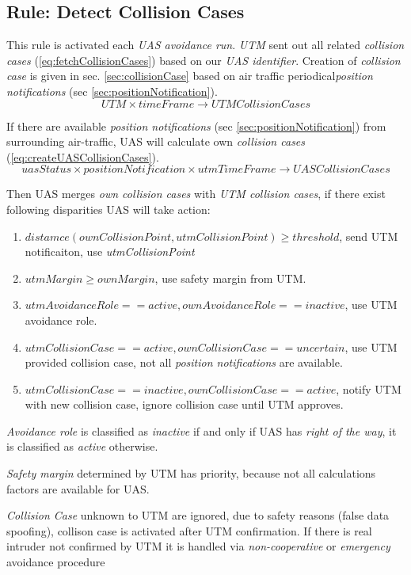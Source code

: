 \subsection{Rule: Detect Collision Cases}\label{sec:detectCollisionCases}
\noindent This rule is activated each \emph{UAS avoidance run}. \emph{UTM} sent out all related \emph{collision cases} (\ref{eq:fetchCollisionCases}) based on our \emph{UAS identifier}. Creation of \emph{collision case} is given in sec. \ref{sec:collisionCase} based on air traffic periodical\emph{position notifications} (sec \ref{sec:positionNotification}).
\begin{equation}\label{eq:fetchCollisionCases}
    UTM\times timeFrame \to UTMCollisionCases
\end{equation}

\noindent If there are available \emph{position notifications} (sec \ref{sec:positionNotification}) from surrounding air-traffic, UAS will calculate own \emph{collision cases} (\ref{eq:createUASCollisionCases}).
\begin{equation}\label{eq:createUASCollisionCases}
    uasStatus\times positionNotification\times utmTimeFrame\to UASCollisionCases
\end{equation}

\noindent Then UAS merges \emph{own collision cases} with \emph{UTM collision cases}, if there exist following disparities UAS will take action:
\begin{enumerate}
    \item $distamce(ownCollisionPoint,utmCollisionPoint)\ge threshold$, send UTM notificaiton, use \emph{utmCollisionPoint}
    \item $utmMargin \ge ownMargin$, use safety margin from UTM.
    \item $utmAvoidanceRole == active, ownAvoidanceRole == inactive$, use UTM avoidance role.
    \item $utmCollisionCase == active, ownCollisionCase == uncertain$, use UTM provided collision case, not all \emph{position notifications} are available. 
    \item $utmCollisionCase == inactive, ownCollisionCase == active$, notify UTM with new collision case, ignore collision case until UTM approves.
\end{enumerate}
\begin{note}
    \emph{Avoidance role} is classified as \emph{inactive} if and only if UAS has \emph{right of the way}, it is classified as \emph{active} otherwise.
    
    \emph{Safety margin} determined by UTM has priority, because not all calculations factors are available for UAS.
    
    \emph{Collision Case} unknown to UTM are ignored, due to safety reasons (false data spoofing), collison case is activated after UTM confirmation. If there is real intruder not confirmed by UTM it is handled via \emph{non-cooperative} or \emph{emergency} avoidance procedure
\end{note}

